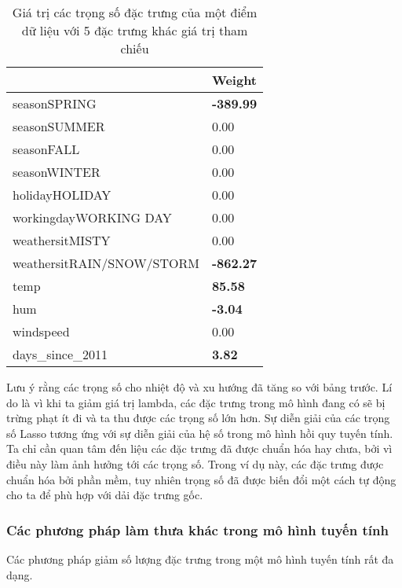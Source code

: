 \begin{table}[]
\centering
\begin{tabular}{|l|l|}
\hline
                          & \textbf{Weight}  \\ \hline
seasonSPRING              & \textbf{-389.99} \\ \hline
seasonSUMMER              & 0.00             \\ \hline
seasonFALL                & 0.00             \\ \hline
seasonWINTER              & 0.00             \\ \hline
holidayHOLIDAY            & 0.00             \\ \hline
workingdayWORKING DAY     & 0.00             \\ \hline
weathersitMISTY           & 0.00             \\ \hline
weathersitRAIN/SNOW/STORM & \textbf{-862.27} \\ \hline
temp                      & \textbf{85.58}   \\ \hline
hum                       & \textbf{-3.04}   \\ \hline
windspeed                 & 0.00             \\ \hline
days\_since\_2011         & \textbf{3.82}    \\ \hline
\end{tabular}
\caption{Giá trị các trọng số đặc trưng của một điểm dữ liệu với 5 đặc trưng khác giá trị tham chiếu}
\label{tab:tab_4_1_7_2}
\end{table}

Lưu ý rằng các trọng số cho nhiệt độ và xu hướng đã tăng so với bảng trước. Lí do là vì khi ta giảm giá trị lambda, các đặc trưng trong mô hình đang có sẽ bị trừng phạt ít đi và ta thu được các trọng số lớn hơn. Sự diễn giải của các trọng số Lasso tương ứng với sự diễn giải của hệ số trong mô hình hồi quy tuyến tính. Ta chỉ cần quan tâm đến liệu các đặc trưng đã được chuẩn hóa hay chưa, bởi vì điều này làm ảnh hưởng tới các trọng số. Trong ví dụ này, các đặc trưng được chuẩn hóa bởi phần mềm, tuy nhiên trọng số đã được biến đổi một cách tự động cho ta để phù hợp với dải đặc trưng gốc.

\subsubsection{Các phương pháp làm thưa khác trong mô hình tuyến tính}
Các phương pháp giảm số lượng đặc trưng trong một mô hình tuyến tính rất đa dạng.


